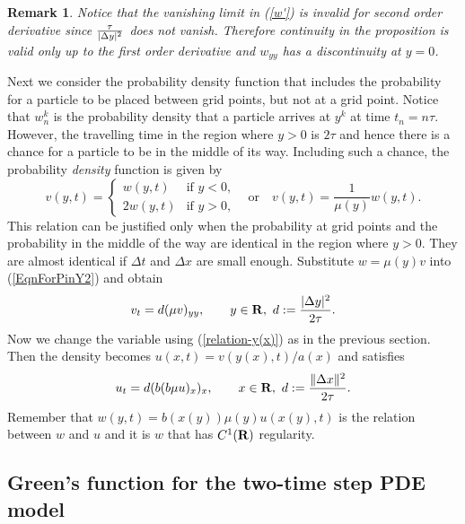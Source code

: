 \documentclass[11pt]{amsart}
\def\R{{\bf R}}
\def\d{d}
\def\R{{\bf R}}
\def\bfR{{\bf R}}
\newtheorem{remark}{Remark}[section]
\begin{document}
\begin{remark}
Notice that the vanishing limit in (\ref{w'}) is invalid for second order derivative since ${\tau\over|\Delta y|^2}$ does not vanish. Therefore continuity in the proposition is valid only up to the first order derivative and $w_{yy}$ has a discontinuity at $y=0$.
\end{remark}

Next we consider the probability density function that includes the probability for a particle to be placed between grid points, but not at a grid point. Notice that $w_n^k$ is the probability density that a particle arrives at $y^k$ at time $t_n=n\tau$. However, the travelling time in the region where $y>0$ is $2\tau$ and hence there is a chance for a particle to be in the middle of its way. Including such a chance, the probability \emph{density} function is given by
\begin{equation*}\label{density}
v(y,t)=
\begin{cases}
w(y,t) & \text{if $y<0$,}\\
2w(y,t) & \text{if $y>0$,}
\end{cases}
\quad \text{or}\quad v(y,t)=\frac{1}{\mu(y)}w(y,t).
\end{equation*}
This relation can be justified only when the probability at grid points and the probability in the middle of the way are identical in the region where $y>0$. They are almost identical if $\Delta t$ and $\Delta x$ are small enough. Substitute $w=\mu(y)v$ into (\ref{EqnForPinY2}) and obtain
\begin{equation*}\label{EqnForUinY2}
v_t=\d (\mu v)_{yy},\qquad y\in\bfR,\ \d:={|\Delta y|^2\over 2\tau}.
\end{equation*}
Now we change the variable using (\ref{relation-y(x)}) as in the previous section. Then the density becomes $u(x,t)=v(y(x),t)/a(x)$ and satisfies
\begin{equation}\label{EqnForUinX2}
u_t=\d (b(b\mu u)_{x})_{x},\qquad x\in\bfR,\ \d:={\|\Delta x\|^2\over 2\tau}.
\end{equation}
Remember that $w(y,t)=b(x(y))\mu(y)u(x(y),t)$ is the relation between $w$ and $u$ and it is $w$ that has $C^1(\R)$ regularity.

\subsection{Green's function for the two-time step PDE model} \label{sect.explicit}
\end{document}

